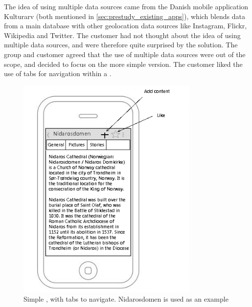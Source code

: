 \documentclass[11pt]{book}
\begin{document}
The idea of using multiple data sources came from the Danish mobile application Kulturarv (both mentioned in \ref{sec:prestudy_existing_apps}), which blends data from a main database with other geolocation data sources like Instagram, Flickr, Wikipedia and Twitter. The customer had not thought about the idea of using multiple data sources, and were therefore quite surprised by the solution. The group and customer agreed that the use of multiple data sources were out of the scope, and decided to focus on the more simple version. The customer liked the use of tabs for navigation within a \wallentitys.

\begin{figure}[H]
    \centering
    \includegraphics[width=0.8\textwidth]{Figures/Phases/Sprint1/versiononeSimpleWall.png}
    \caption{Simple \wallentitys, with tabs to navigate. Nidarosdomen is used as an example}
    \label{fig:phases_sprint1_uiVersionOneSimpleWall}
\end{figure}
\end{document}
